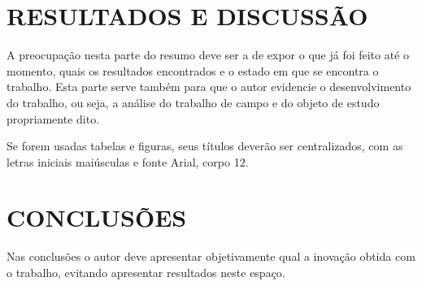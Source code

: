 \documentclass[12pt, a4paper]{article}
\begin{document}
	\section{RESULTADOS E DISCUSSÃO}
	A preocupação nesta parte do resumo deve ser a de expor o que já foi feito 
	até o momento, quais os resultados encontrados e o estado em que se 
	encontra o trabalho. Esta parte serve também para que o autor evidencie o 
	desenvolvimento do trabalho, ou seja, a análise do trabalho de campo e do	
	objeto de estudo propriamente dito.
	
	Se forem usadas tabelas e figuras, seus títulos deverão ser centralizados, 
	com as letras iniciais maiúsculas e fonte Arial, corpo 12. 
	
	\section{CONCLUSÕES}
	Nas conclusões o autor deve apresentar objetivamente qual a inovação obtida 
	com o trabalho, evitando apresentar resultados neste espaço. 
\end{document}
